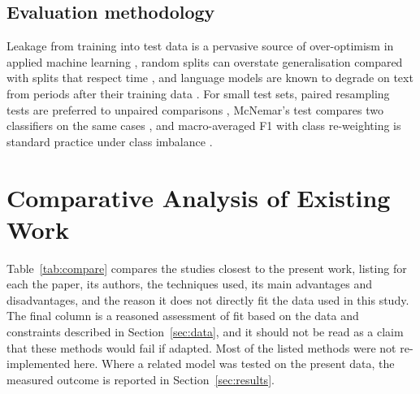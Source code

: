 \documentclass[journal]{IEEEtran}
\begin{document}
\subsection{Evaluation methodology}
Leakage from training into test data is a pervasive source of over-optimism in applied machine learning \cite{r27}, random splits can overstate generalisation compared with splits that respect time \cite{r25}, and language models are known to degrade on text from periods after their training data \cite{r26}. For small test sets, paired resampling tests are preferred to unpaired comparisons \cite{r28,r34}, McNemar's test compares two classifiers on the same cases \cite{r35}, and macro-averaged F1 with class re-weighting is standard practice under class imbalance \cite{r60}.

\section{Comparative Analysis of Existing Work}\label{sec:compare}
Table~\ref{tab:compare} compares the studies closest to the present work, listing for each the paper, its authors, the techniques used, its main advantages and disadvantages, and the reason it does not directly fit the data used in this study. The final column is a reasoned assessment of fit based on the data and constraints described in Section~\ref{sec:data}, and it should not be read as a claim that these methods would fail if adapted. Most of the listed methods were not re-implemented here. Where a related model was tested on the present data, the measured outcome is reported in Section~\ref{sec:results}.
\end{document}
